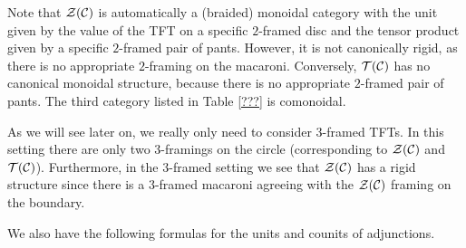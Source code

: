 \documentclass{amsart}
\begin{document}
\begin{remark}
Note that $\mathcal Z(\mathcal C)$ is automatically a (braided) monoidal category with the unit given by the value of the TFT on a specific $2$-framed disc and the tensor product given by a specific $2$-framed pair of pants.  However, it is not canonically rigid, as there is no appropriate $2$-framing on the macaroni.  Conversely, $\mathcal T(\mathcal C)$ has no canonical monoidal structure, because there is no appropriate $2$-framed pair of pants.  The third category listed in Table \ref{???} is comonoidal.

As we will see later on, we really only need to consider $3$-framed TFTs.  In this setting there are only two $3$-framings on the circle (corresponding to $\mathcal Z(\mathcal C)$ and $\mathcal T(\mathcal C)$).  Furthermore, in the $3$-framed setting we see that $\mathcal Z(\mathcal C)$ has a rigid structure since there is a $3$-framed macaroni agreeing with the $\mathcal Z(\mathcal C)$ framing on the boundary.
\end{remark}

We also have the following formulas for the units and counits of adjunctions.
\end{document}
